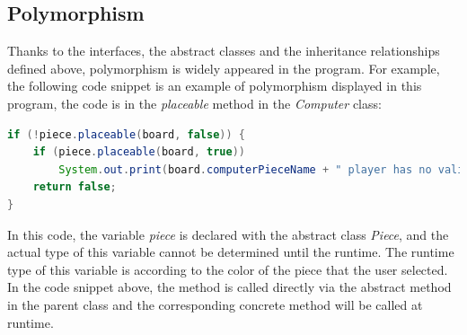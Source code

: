 \documentclass[a4paper]{report}
\begin{document}
\subsection{Polymorphism}
Thanks to the interfaces, the abstract classes and the inheritance relationships defined above, polymorphism is widely appeared in the program. For example, the following code snippet is an example of polymorphism displayed in this program, the code is in the \emph{placeable} method in the \emph{Computer} class:
\begin{lstlisting}[language=java]
if (!piece.placeable(board, false)) {
    if (piece.placeable(board, true))
        System.out.print(board.computerPieceName + " player has no valid move. ");
    return false;
}
\end{lstlisting}
In this code, the variable \emph{piece} is declared with the abstract class \emph{Piece}, and the actual type of this variable cannot be determined until the runtime. The runtime type of this variable is according to the color of the piece that the user selected. In the code snippet above, the method is called directly via the abstract method in the parent class and the corresponding concrete method will be called at runtime.
\end{document}

